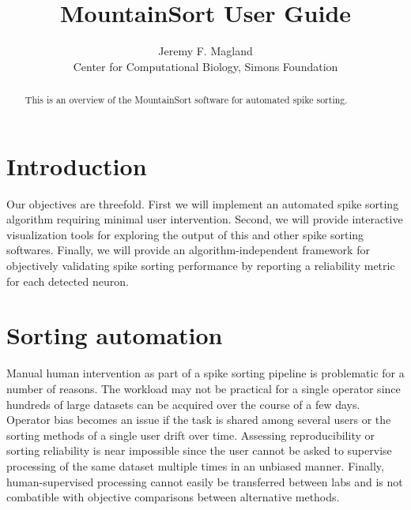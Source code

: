 \documentclass[hidelinks,10pt]{article}
\begin{document}
\def\spacingset#1{\renewcommand{\baselinestretch}%
{#1}\small\normalsize} \spacingset{1}



\title{\bf MountainSort User Guide}
\author{Jeremy F. Magland\hspace{.2cm}\\
  Center for Computational Biology, Simons Foundation\\
  }
\maketitle

\bigskip
\begin{abstract}
This is an overview of the MountainSort software for automated spike sorting.
\end{abstract}

\vfill

\newpage

\section {Introduction}

Our objectives are threefold. First we will implement an automated spike sorting algorithm requiring minimal user intervention. Second, we will provide interactive visualization tools for exploring the output of this and other spike sorting softwares. Finally, we will provide an algorithm-independent framework for objectively validating spike sorting performance by reporting a reliability metric for each detected neuron.

\section {Sorting automation}

Manual human intervention as part of a spike sorting pipeline is problematic for a number of reasons. The workload may not be practical for a single operator since hundreds of large datasets can be acquired over the course of a few days. Operator bias becomes an issue if the task is shared among several users or the sorting methods of a single user drift over time. Assessing reproducibility or sorting reliability is near impossible since the user cannot be asked to supervise processing of the same dataset multiple times in an unbiased manner. Finally, human-supervised processing cannot easily be transferred between labs and is not combatible with objective comparisons between alternative methods. 
\end{document}
